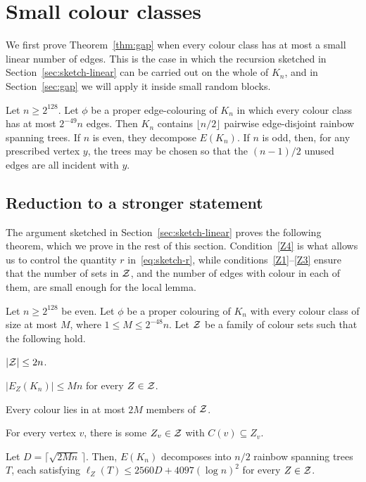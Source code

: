 \section{Small colour classes}\label{sec:recursion}
We first prove Theorem~\ref{thm:gap} when every colour class has at most a small linear number of edges.
This is the case in which the recursion sketched in Section~\ref{sec:sketch-linear} can be carried out on the whole of $K_n$, and in Section~\ref{sec:gap} we will apply it inside small random blocks.

\begin{theorem}\label{thm:linear}
Let $n\ge 2^{128}$. Let $\phi$ be a proper edge-colouring of $K_n$ in which every colour class has at most $2^{-49}n$ edges.
Then $K_n$ contains $\lfloor n/2\rfloor$ pairwise edge-disjoint rainbow spanning trees.
If $n$ is even, they decompose $E(K_n)$.
If $n$ is odd, then, for any prescribed vertex $y$, the trees may be chosen so that the $(n-1)/2$ unused edges are all incident with $y$.
\end{theorem}

\subsection{Reduction to a stronger statement}\label{sec:reduction}
The argument sketched in Section~\ref{sec:sketch-linear} proves the following theorem, which we prove in the rest of this section.
Condition~\ref{Z4} is what allows us to control the quantity $r$ in~\eqref{eq:sketch-r}, while conditions~\ref{Z1}--\ref{Z3} ensure that the number of sets in $\mathcal{Z}$, and the number of edges with colour in each of them, are small enough for the local lemma.

\begin{theorem}\label{thm:tests}
Let $n\ge2^{128}$ be even. Let $\phi$ be a proper colouring of $K_n$ with every colour class of size at most $M$, where $1\le M\le 2^{-48}n$. Let $\mathcal{Z}$ be a family of colour sets such that the following hold.
\begin{props}
\item $|\mathcal{Z}|\le2n$.\label{Z1}
\item $|E_Z(K_n)|\le Mn$ for every $Z\in\mathcal{Z}$.\label{Z2}
\item Every colour lies in at most $2M$ members of $\mathcal{Z}$.\label{Z3}
\item For every vertex $v$, there is some $Z_v\in\mathcal{Z}$ with $C(v)\subseteq Z_v$.\label{Z4}
\end{props}
Let $D=\lceil\sqrt{2Mn}\,\rceil$. Then, $E(K_n)$ decomposes into $n/2$ rainbow spanning trees $T$, each satisfying $\ell_Z(T)\le 2560D+4097(\log n)^2$ for every $Z\in\mathcal{Z}$.
\end{theorem}

